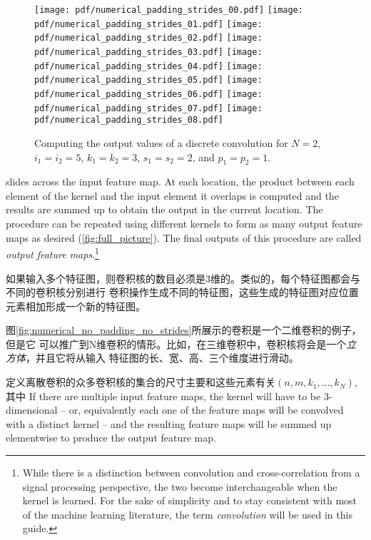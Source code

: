 \documentclass[notitlepage]{report}
\begin{document}
\begin{figure}[p]
    \centering
    \texttt{[image: pdf/numerical\_padding\_strides\_00.pdf]}
    \texttt{[image: pdf/numerical\_padding\_strides\_01.pdf]}
    \texttt{[image: pdf/numerical\_padding\_strides\_02.pdf]}
    \texttt{[image: pdf/numerical\_padding\_strides\_03.pdf]}
    \texttt{[image: pdf/numerical\_padding\_strides\_04.pdf]}
    \texttt{[image: pdf/numerical\_padding\_strides\_05.pdf]}
    \texttt{[image: pdf/numerical\_padding\_strides\_06.pdf]}
    \texttt{[image: pdf/numerical\_padding\_strides\_07.pdf]}
    \texttt{[image: pdf/numerical\_padding\_strides\_08.pdf]}
    \caption{\label{fig:numerical_padding_strides} Computing the output values
        of a discrete convolution for $N = 2$, $i_1 = i_2 = 5$, $k_1 = k_2 = 3$,
        $s_1 = s_2 = 2$, and $p_1 = p_2 = 1$.}
\end{figure}

\noindent slides across the input feature map. At each location, the product
between each element of the kernel and the input element it overlaps is computed
and the results are summed up to obtain the output in the current location. The
procedure can be repeated using different kernels to form as many output feature
maps as desired (\autoref{fig:full_picture}). The final outputs of this procedure
are called {\em output feature maps}.\footnote{%
    While there is a distinction between convolution and cross-correlation from
    a signal processing perspective, the two become interchangeable when the
    kernel is learned. For the sake of simplicity and to stay consistent with
    most of the machine learning literature, the term {\em convolution\/}
    will be used in this guide.}

如果输入多个特征图，则卷积核的数目必须是3维的。类似的，每个特征图都会与不同的卷积核分别进行
卷积操作生成不同的特征图，这些生成的特征图对应位置元素相加形成一个新的特征图。

图\autoref{fig:numerical_no_padding_no_strides}所展示的卷积是一个二维卷积的例子，但是它
可以推广到N维卷积的情形。比如，在三维卷积中，卷积核将会是一个{\em 立方体\/}，并且它将从输入
特征图的长、宽、高、三个维度进行滑动。

定义离散卷积的众多卷积核的集合的尺寸主要和这些元素有关$(n, m, k_1, \ldots, k_N)$,
其中
If there are multiple input feature maps, the kernel will have to be
3-dimensional -- or, equivalently each one of the feature maps will be
convolved with a distinct kernel -- and the resulting feature maps will
be summed up elementwise to produce the output feature map.
\end{document}
